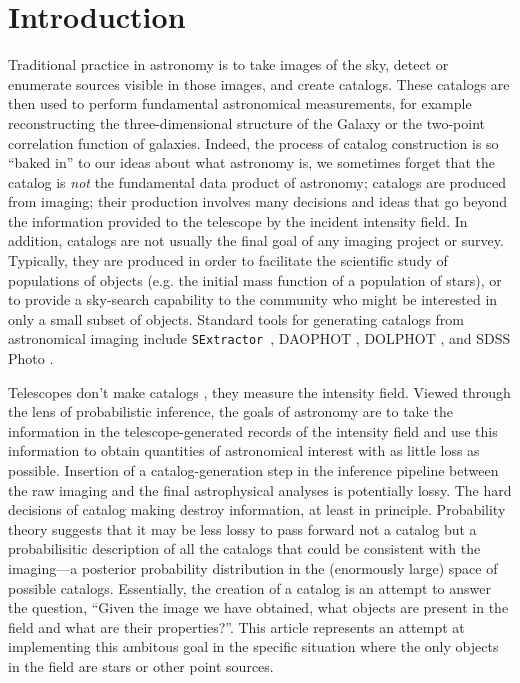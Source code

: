 \documentclass[12pt, preprint]{aastex}
\newcommand{\sex}{{\tt SExtractor}}
\begin{document}
\section{Introduction}
Traditional practice in astronomy is to take images of the sky, detect
or enumerate sources visible in those images, and create catalogs.
These catalogs are then used to perform fundamental astronomical
measurements, for example reconstructing the three-dimensional
structure of the Galaxy or the two-point correlation function of
galaxies.  Indeed, the process of catalog construction is so ``baked
in'' to our ideas about what astronomy is, we sometimes forget that
the catalog is \emph{not} the fundamental data product of astronomy; catalogs are produced
from imaging; their production involves many decisions and ideas
that go beyond the information provided to the telescope by the
incident intensity field. In addition, catalogs are not usually the final
goal of any imaging project or survey. Typically, they are produced in
order to facilitate the scientific study of populations of objects (e.g. the
initial mass function of a population of stars), or to provide a sky-search
capability to the community who might be interested in only a small subset of
objects. Standard tools for generating catalogs from astronomical imaging
include \sex~\citep{sextractor}, DAOPHOT \citep{1987PASP...99..191S}, 
DOLPHOT \citep{dolphot}, and SDSS
Photo \citep{photo}.

Telescopes don't make catalogs \citep{2011EAS....45..351H}, they
measure the intensity field.  Viewed through the lens of probabilistic
inference, the goals of astronomy are to take the information in the
telescope-generated records of the intensity field and use this information
to obtain quantities of astronomical interest with as little loss as
possible.  Insertion of a catalog-generation step in the inference
pipeline between the raw imaging and the final astrophysical analyses
is potentially lossy. The hard decisions of catalog making destroy
information, at least in principle.  Probability theory suggests that it may be less
lossy to pass forward not a catalog but a probabilisitic
description of all the catalogs that could be consistent with the
imaging---a posterior probability distribution in the (enormously large) space of possible catalogs.
Essentially, the creation of a catalog is an
attempt to answer the question,
``Given the image we have obtained, what objects are present in the field and
what are their properties?''.
This article represents an attempt at implementing this ambitous goal in the specific
situation where the only objects in the field are stars or other point sources.
\end{document}
